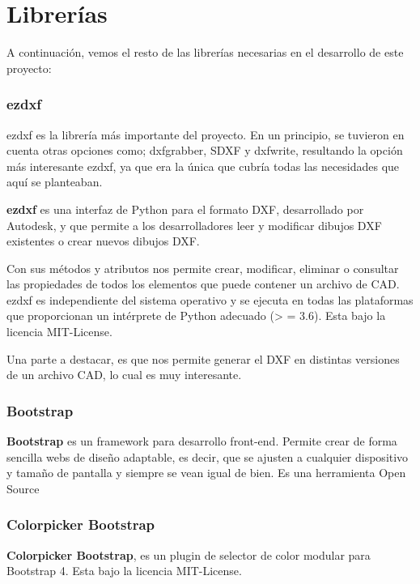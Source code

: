 \section{Librerías}

A continuación, vemos el resto de las librerías necesarias en el desarrollo de este proyecto:


\subsubsection{ezdxf}

ezdxf es la librería más importante del proyecto. En un principio, se tuvieron en cuenta otras opciones como; dxfgrabber, SDXF y  dxfwrite, resultando la opción más interesante ezdxf, ya que era la única que cubría todas las necesidades que aquí se planteaban.

\textbf{ezdxf} es una interfaz de Python para el formato DXF, desarrollado por Autodesk, y que permite a los desarrolladores leer y modificar dibujos DXF existentes o crear nuevos dibujos DXF.

Con sus métodos y atributos nos permite crear, modificar, eliminar o consultar las propiedades de todos los elementos que puede contener un archivo de CAD.
ezdxf es independiente del sistema operativo y se ejecuta en todas las plataformas que proporcionan un intérprete de Python adecuado (> = 3.6). Esta bajo la licencia MIT-License.

Una parte a destacar, es que nos permite generar el DXF en distintas versiones de un archivo CAD, lo cual es muy interesante. 



\subsubsection{Bootstrap}

\textbf{Bootstrap} es un framework para desarrollo front-end. Permite crear de forma sencilla webs de diseño adaptable, es decir, que se ajusten a cualquier dispositivo y tamaño de pantalla y siempre se vean igual de bien.
Es una herramienta Open Source


\subsubsection{Colorpicker Bootstrap}

\textbf{Colorpicker Bootstrap},  es un plugin de selector de color modular para Bootstrap 4. Esta bajo la licencia MIT-License.


